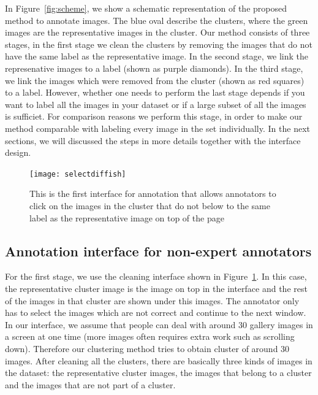 In Figure~\ref{fig:scheme}, we show a schematic representation of the proposed method to annotate images. 
The blue oval describe the clusters, where the green images are the representative images in the cluster. Our
method consists of three stages, in the first stage we clean the clusters by removing the images that do not have
the same label as the representative image. In the second stage, we link the represenative images to a label
(shown as purple diamonds). In the third stage, we link the images which were removed from the cluster (shown as
red squares) to a label. However, whether one needs to perform the last stage depends if you want to label all 
the images in your dataset or if a large subset of all the images is sufficiet.
For comparison reasons we perform this stage, in order to make our method comparable with labeling every image
in the set individually. In the next sections, we will discussed the steps in more 
details together with the interface design. 
% 
\begin{figure}
\begin{center}
\texttt{[image: selectdiffish]}
\caption{This is the first interface for annotation that allows annotators to click on the images in the cluster that do not
below to the same label as the representative image on top of the page}
\label{fig:interface1}
\end{center}
\end{figure}
%

\subsection{Annotation interface for non-expert annotators}
For the first stage, we use the cleaning interface shown in Figure~\ref{fig:interface1}. In this case, the
representative cluster image is the image on top in the interface and the rest of the images in that cluster
are shown under this images. The annotator only has to select the images which are not correct and continue to
the next window. In our interface, we assume that people can deal with around 30 gallery 
images in a screen at one time (more images often requires extra work such as scrolling down).
Therefore our clustering method tries to obtain cluster of around 30 images. 
After cleaning all the clusters, there are basically three kinds of images in
the dataset: the representative cluster images, the images that belong to a cluster and the images that are not
part of a cluster.\\ 


